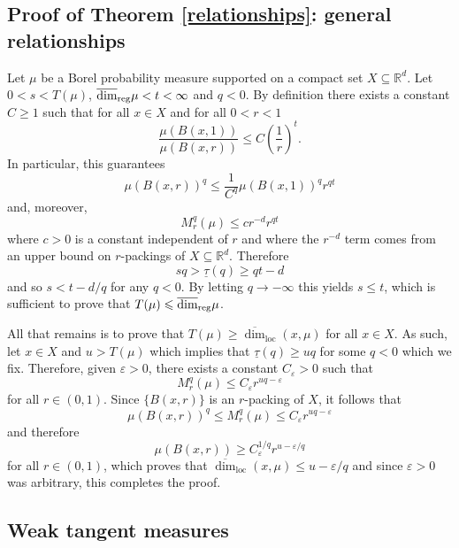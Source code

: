 \documentclass[12pt]{amsart}
\numberwithin{equation}{section}
\renewcommand{\ge}{\geqslant}
\renewcommand{\le}{\leqslant}
\renewcommand{\geq}{\geqslant}
\renewcommand{\leq}{\leqslant}
\renewcommand{\l}{\overline{\dim}_{\text{loc}}(x,\mu)}
\renewcommand{\r}{\overline{\dim}_{\textup{reg}} \mu}
\renewcommand{\epsilon}{\varepsilon}
\begin{document}
\subsection{Proof of Theorem \ref{relationships}: general relationships}\label{spectrumproof}

Let $\mu$ be a Borel probability measure supported on a compact set $X \subseteq \mathbb{R}^d$. Let $0<s< T(\mu)$,  $\r < t < \infty$ and $q<0$. By definition there exists a  constant  $C \geq 1$ such that for all $x\in X$ and for all $0<r< 1$
\[
\frac{\mu(B(x,1))}{\mu(B(x,r))} \le C \left(\frac{1}{r} \right)^t.
\]
In particular, this guarantees 
\[
\mu(B(x,r))^q \le \frac{1}{C^q}\mu(B(x,1))^q  r^{qt}
\]
and, moreover, 
\[
M_r^q(\mu) \leq c r^{-d}r^{qt}
\]
where $c>0$ is a constant independent of  $r$ and where the $r^{-d}$ term comes from an upper bound on $r$-packings of $X \subseteq \mathbb{R}^d$.  Therefore 
\[
sq > \underline{\tau}(q)   \ge  qt-d
\]
and so $s<t-d/q$ for any $q<0$. By letting $q \rightarrow - \infty$ this yields $s \le t$, which is sufficient to prove that $T(\mu) \leq \r$.

 All that remains is to prove that $T(\mu) \geq \l$ for all $x \in X$.  As such, let $x \in X$ and $u>T(\mu)$ which implies that $\underline{\tau}(q)  \geq  uq$ for some $q<0$ which we fix.  Therefore, given $\epsilon>0$, there exists a constant $C_\epsilon>0$ such that
\[
M_r^q(\mu) \leq C_\epsilon r^{uq-\epsilon}
\]
for all $r \in (0,1)$.  Since $\{ B(x,r)\}$ is an $r$-packing of $X$, it follows that
\[
\mu(B(x,r))^q \le M_r^q(\mu) \leq C_\epsilon r^{uq-\epsilon}
\]
and therefore
\[
\mu(B(x,r)) \ge  C_\epsilon^{1/q} r^{u-\epsilon/q}
\]
for all $r\in (0,1)$, which proves that $\l \le u-\epsilon/q$ and since $\epsilon>0$ was arbitrary, this completes the proof.



\subsection{Weak tangent measures} \label{weaktangentsproof}
\end{document}
